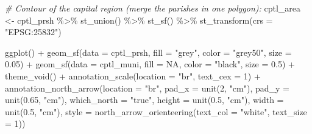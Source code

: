 \documentclass[
  12pt,
]{article}
\newenvironment{Shaded}{\begin{snugshade}}{\end{snugshade}}
\newcommand{\AttributeTok}[1]{\textcolor[rgb]{0.77,0.63,0.00}{#1}}
\newcommand{\CommentTok}[1]{\textcolor[rgb]{0.56,0.35,0.01}{\textit{#1}}}
\newcommand{\ConstantTok}[1]{\textcolor[rgb]{0.00,0.00,0.00}{#1}}
\newcommand{\DecValTok}[1]{\textcolor[rgb]{0.00,0.00,0.81}{#1}}
\newcommand{\FloatTok}[1]{\textcolor[rgb]{0.00,0.00,0.81}{#1}}
\newcommand{\FunctionTok}[1]{\textcolor[rgb]{0.00,0.00,0.00}{#1}}
\newcommand{\NormalTok}[1]{#1}
\newcommand{\OtherTok}[1]{\textcolor[rgb]{0.56,0.35,0.01}{#1}}
\newcommand{\SpecialCharTok}[1]{\textcolor[rgb]{0.00,0.00,0.00}{#1}}
\newcommand{\StringTok}[1]{\textcolor[rgb]{0.31,0.60,0.02}{#1}}
\begin{document}
\begin{Shaded}
\begin{Highlighting}[]
\CommentTok{\# Contour of the capital region (merge the parishes in one polygon):}
\NormalTok{cptl\_area }\OtherTok{\textless{}{-}}\NormalTok{ cptl\_prsh }\SpecialCharTok{\%\textgreater{}\%}
  \FunctionTok{st\_union}\NormalTok{() }\SpecialCharTok{\%\textgreater{}\%}
  \FunctionTok{st\_sf}\NormalTok{() }\SpecialCharTok{\%\textgreater{}\%} 
  \FunctionTok{st\_transform}\NormalTok{(}\AttributeTok{crs =} \StringTok{"EPSG:25832"}\NormalTok{)}
\end{Highlighting}
\end{Shaded}

\begin{Shaded}
\begin{Highlighting}[]
\FunctionTok{ggplot}\NormalTok{() }\SpecialCharTok{+} 
  \FunctionTok{geom\_sf}\NormalTok{(}\AttributeTok{data =}\NormalTok{ cptl\_prsh, }
          \AttributeTok{fill =} \StringTok{"grey"}\NormalTok{, }
          \AttributeTok{color =} \StringTok{"grey50"}\NormalTok{, }
          \AttributeTok{size =} \FloatTok{0.05}\NormalTok{) }\SpecialCharTok{+}
  \FunctionTok{geom\_sf}\NormalTok{(}\AttributeTok{data =}\NormalTok{ cptl\_muni, }
          \AttributeTok{fill =} \ConstantTok{NA}\NormalTok{, }
          \AttributeTok{color =} \StringTok{"black"}\NormalTok{,}
          \AttributeTok{size =} \FloatTok{0.5}\NormalTok{) }\SpecialCharTok{+}
  \FunctionTok{theme\_void}\NormalTok{() }\SpecialCharTok{+}
  \FunctionTok{annotation\_scale}\NormalTok{(}\AttributeTok{location =} \StringTok{"br"}\NormalTok{, }\AttributeTok{text\_cex =} \DecValTok{1}\NormalTok{) }\SpecialCharTok{+}
  \FunctionTok{annotation\_north\_arrow}\NormalTok{(}\AttributeTok{location =} \StringTok{"br"}\NormalTok{,}
                         \AttributeTok{pad\_x =} \FunctionTok{unit}\NormalTok{(}\DecValTok{2}\NormalTok{, }\StringTok{"cm"}\NormalTok{),}
                         \AttributeTok{pad\_y =} \FunctionTok{unit}\NormalTok{(}\FloatTok{0.65}\NormalTok{, }\StringTok{"cm"}\NormalTok{),}
                         \AttributeTok{which\_north =} \StringTok{"true"}\NormalTok{,}
                         \AttributeTok{height =} \FunctionTok{unit}\NormalTok{(}\FloatTok{0.5}\NormalTok{, }\StringTok{"cm"}\NormalTok{),}
                         \AttributeTok{width =} \FunctionTok{unit}\NormalTok{(}\FloatTok{0.5}\NormalTok{, }\StringTok{"cm"}\NormalTok{),}
                         \AttributeTok{style =} \FunctionTok{north\_arrow\_orienteering}\NormalTok{(}\AttributeTok{text\_col =} \StringTok{"white"}\NormalTok{,}
                                                          \AttributeTok{text\_size =} \DecValTok{1}\NormalTok{))}
\end{Highlighting}
\end{Shaded}
\end{document}
